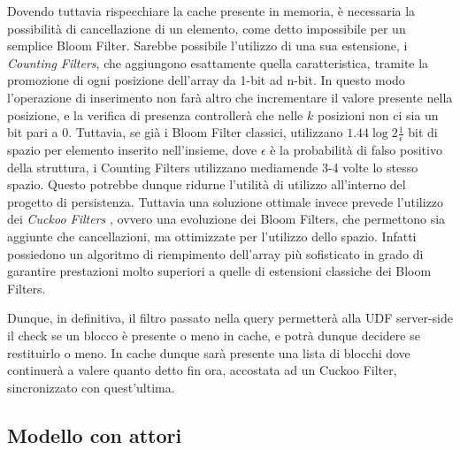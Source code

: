 		Dovendo tuttavia rispecchiare la cache presente in memoria, è necessaria la possibilità di cancellazione di un elemento, come detto impossibile per un semplice Bloom Filter. Sarebbe possibile l'utilizzo di una sua estensione, i \textit{Counting Filters}, che aggiungono esattamente quella caratteristica, tramite la promozione di ogni posizione dell'array da 1-bit ad n-bit. In questo modo l'operazione di inserimento non farà altro che incrementare il valore presente nella posizione, e la verifica di presenza controllerà che nelle $ k $ posizioni non ci sia un bit pari a 0. Tuttavia, se già i Bloom Filter classici, utilizzano $ 1.44\log{2}{\frac{1}{\epsilon}} $ bit di spazio per elemento inserito nell'insieme, dove $\epsilon$ è la probabilità di falso positivo della struttura, i Counting Filters utilizzano mediamende 3-4 volte lo stesso spazio. Questo potrebbe dunque ridurne l'utilità di utilizzo all'interno del progetto di persistenza.
		Tuttavia una soluzione ottimale invece prevede l'utilizzo dei \textit{Cuckoo Filters} \cite{cuckoo}, ovvero una evoluzione dei Bloom Filters, che permettono sia aggiunte che cancellazioni, ma ottimizzate per l'utilizzo dello spazio. Infatti possiedono un algoritmo di riempimento dell'array più sofisticato in grado di garantire prestazioni molto superiori a quelle di estensioni classiche dei Bloom Filters.
		
		Dunque, in definitiva, il filtro passato nella query permetterà alla UDF server-side il check se un blocco è presente o meno in cache, e potrà dunque decidere se restituirlo o meno. In cache dunque sarà presente una lista di blocchi dove continuerà a valere quanto detto fin ora, accostata ad un Cuckoo Filter, sincronizzato con quest'ultima. 
		

	\subsection{Modello con attori}
	

